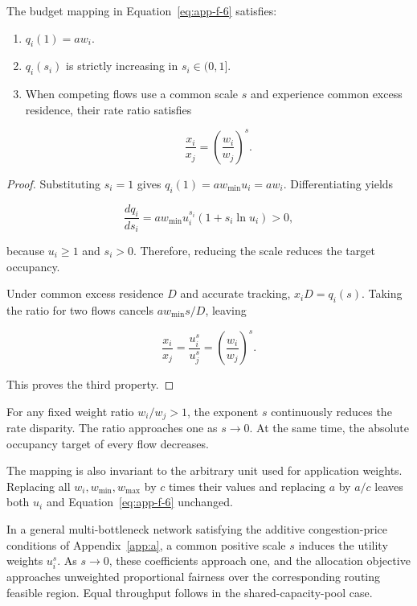 \begin{lemma}
\label{lem:f-1}
The budget mapping in Equation~\eqref{eq:app-f-6} satisfies:

\begin{enumerate}
\item \(q_i(1)=aw_i\).
\item \(q_i(s_i)\) is strictly increasing in \(s_i\in(0,1]\).
\item When competing flows use a common scale \(s\) and experience common excess residence, their rate ratio satisfies

\begin{equation}
\label{eq:app-f-7}
\frac{x_i}{x_j}
=
\left(\frac{w_i}{w_j}\right)^s.
\end{equation}
\end{enumerate}
\end{lemma}

\begin{proof} Substituting \(s_i=1\) gives \(q_i(1)=aw_{\min}u_i=aw_i\). Differentiating yields

\begin{equation}
\label{eq:app-f-8}
\frac{dq_i}{ds_i}
=
aw_{\min}u_i^{s_i}
(1+s_i\ln u_i)>0,
\end{equation}

because \(u_i\ge1\) and \(s_i>0\). Therefore, reducing the scale reduces the target occupancy.

Under common excess residence \(D\) and accurate tracking, \(x_iD=q_i(s)\). Taking the ratio for two flows cancels \(aw_{\min}s/D\), leaving

\[
\frac{x_i}{x_j}
=
\frac{u_i^s}{u_j^s}
=
\left(\frac{w_i}{w_j}\right)^s.
\]

This proves the third property.
\end{proof}

For any fixed weight ratio \(w_i/w_j>1\), the exponent \(s\) continuously reduces the rate disparity. The ratio approaches one as \(s\to0\). At the same time, the absolute occupancy target of every flow decreases.

The mapping is also invariant to the arbitrary unit used for application weights. Replacing all \(w_i,w_{\min},w_{\max}\) by \(c\) times their values and replacing \(a\) by \(a/c\) leaves both \(u_i\) and Equation~\eqref{eq:app-f-6} unchanged.

In a general multi-bottleneck network satisfying the additive congestion-price conditions of Appendix~\ref{app:a}, a common positive scale \(s\) induces the utility weights \(u_i^s\). As \(s\to0\), these coefficients approach one, and the allocation objective approaches unweighted proportional fairness over the corresponding routing feasible region. Equal throughput follows in the shared-capacity-pool case.

